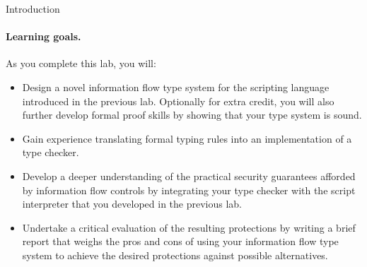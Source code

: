 \documentclass[11pt]{article}
\begin{document}
{\begin{problem}{Introduction}
  \paragraph{Learning goals.}
    As you complete this lab, you will:
    \begin{itemize}
      \item Design a novel information flow type system for the scripting language introduced in the previous lab. 
      Optionally for extra credit, you will also further develop formal proof skills by showing that your type system is sound.
      \item Gain experience translating formal typing rules into an implementation of a type checker.
      \item Develop a deeper understanding of the practical security guarantees afforded by information flow controls 
      by integrating your type checker with the script interpreter that you developed in the previous lab.
      \item Undertake a critical evaluation of the resulting protections by writing a brief report that weighs the 
      pros and cons of using your information flow type system to achieve the desired protections against possible alternatives.
    \end{itemize}

  \newpage

\end{problem}}
\end{document}
